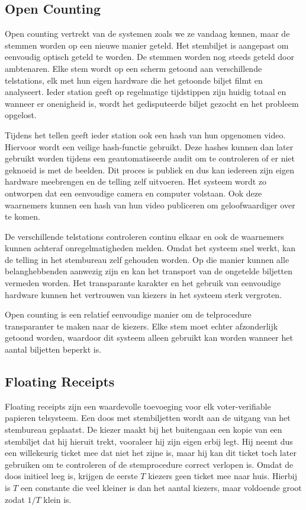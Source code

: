 \subsection{Open Counting~\cite{adi_schuler_frohlich_open_counting}}
\label{sec:ls:open_counting}

Open counting vertrekt van de systemen zoals we ze vandaag kennen, maar de stemmen worden op een nieuwe manier geteld. Het stembiljet is aangepast om eenvoudig optisch geteld te worden. De stemmen worden nog steeds geteld door ambtenaren. Elke stem wordt op een scherm getoond aan verschillende telstations, elk met hun eigen hardware die het getoonde biljet filmt en analyseert. Ieder station geeft op regelmatige tijdstippen zijn huidig totaal en wanneer er onenigheid is, wordt het gedisputeerde biljet gezocht en het probleem opgelost.

\npar Tijdens het tellen geeft ieder station ook een hash van hun opgenomen video. Hiervoor wordt een veilige hash-functie gebruikt. Deze hashes kunnen dan later gebruikt worden tijdens een geautomatiseerde audit om te controleren of er niet geknoeid is met de beelden. Dit proces is publiek en dus kan iedereen zijn eigen hardware meebrengen en de telling zelf uitvoeren. Het systeem wordt zo ontworpen dat een eenvoudige camera en computer volstaan. Ook deze waarnemers kunnen een hash van hun video publiceren om geloofwaardiger over te komen.

\npar De verschillende telstations controleren continu elkaar en ook de waarnemers kunnen achteraf onregelmatigheden melden. Omdat het systeem snel werkt, kan de telling in het stembureau zelf gehouden worden. Op die manier kunnen alle belanghebbenden aanwezig zijn en kan het transport van de ongetelde biljetten vermeden worden. Het transparante karakter en het gebruik van eenvoudige hardware kunnen het vertrouwen van kiezers in het systeem sterk vergroten.

\npar Open counting is een relatief eenvoudige manier om de telprocedure transparanter te maken naar de kiezers. Elke stem moet echter afzonderlijk getoond worden, waardoor dit systeem alleen gebruikt kan worden wanneer het aantal biljetten beperkt is.

\subsection{Floating Receipts~\cite{rivest_smith_three_voting_protocols}}
\label{sec:ls:floating_receipts}

Floating receipts zijn een waardevolle toevoeging voor elk voter-verifiable papieren telsysteem. Een doos met stembiljetten wordt aan de uitgang van het stembureau geplaatst. De kiezer maakt bij het buitengaan een kopie van een stembiljet dat hij hieruit trekt, vooraleer hij zijn eigen erbij legt. Hij neemt dus een willekeurig ticket mee dat niet het zijne is, maar hij kan dit ticket toch later gebruiken om te controleren of de stemprocedure correct verlopen is. Omdat de doos initieel leeg is, krijgen de eerste $T$ kiezers geen ticket mee naar huis. Hierbij is $T$ een constante die veel kleiner is dan het aantal kiezers, maar voldoende groot zodat $1/T$ klein is.


